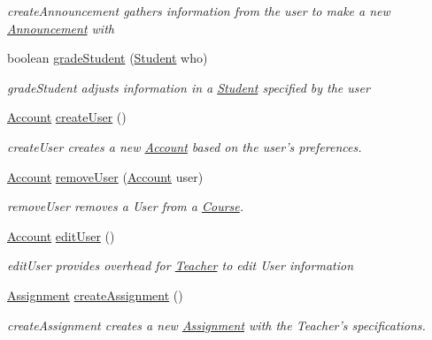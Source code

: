 \begin{CompactItemize}
\begin{CompactList}\small\item\em createAnnouncement gathers information from the user to make a new \hyperlink{classAnnouncement}{Announcement} with \item\end{CompactList}\item 
boolean \hyperlink{classTeacher_73ab8b195a8a889009cb22a228d9e798}{gradeStudent} (\hyperlink{classStudent}{Student} who)
\begin{CompactList}\small\item\em gradeStudent adjusts information in a \hyperlink{classStudent}{Student} specified by the user \item\end{CompactList}\item 
\hyperlink{classAccount}{Account} \hyperlink{classTeacher_4f49b057859fa1b088155706eac4fcb1}{createUser} ()
\begin{CompactList}\small\item\em createUser creates a new \hyperlink{classAccount}{Account} based on the user's preferences. \item\end{CompactList}\item 
\hyperlink{classAccount}{Account} \hyperlink{classTeacher_59fe81a1fc82001e8900f1aad53be32c}{removeUser} (\hyperlink{classAccount}{Account} user)
\begin{CompactList}\small\item\em removeUser removes a User from a \hyperlink{classCourse}{Course}. \item\end{CompactList}\item 
\hyperlink{classAccount}{Account} \hyperlink{classTeacher_5d5be5a2ae64b675db80e17d83bfb5df}{editUser} ()
\begin{CompactList}\small\item\em editUser provides overhead for \hyperlink{classTeacher}{Teacher} to edit User information \item\end{CompactList}\item 
\hyperlink{classAssignment}{Assignment} \hyperlink{classTeacher_d74b81653f3e262d69b3aea9ceccbcbf}{createAssignment} ()
\begin{CompactList}\small\item\em createAssignment creates a new \hyperlink{classAssignment}{Assignment} with the Teacher's specifications. \item\end{CompactList}\item 

\end{CompactItemize}
